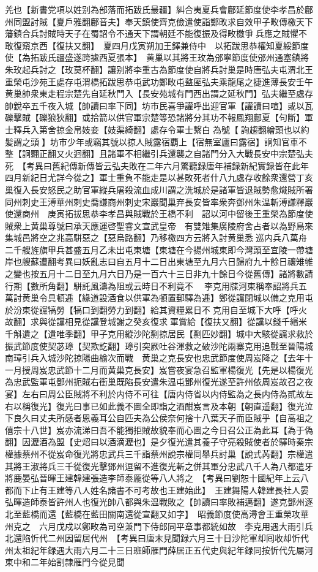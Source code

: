 羌也【新書党項以姓别為部落而拓跋氏最疆】糾合夷夏兵會鄜延節度使李孝昌於鄜州同盟討賊【夏戶雅翻鄜音夫】奉天鎮使齊克儉遣使詣鄭畋求自效甲子畋傳檄天下藩鎮合兵討賊時天子在蜀詔令不通天下謂朝廷不能復振及得畋檄爭兵應之賊懼不敢復窺京西【復扶又翻】　夏四月戊寅朔加王鐸兼侍中　以拓跋思恭權知夏綏節度使【為拓跋氏疆盛遂跨㨿西夏張本】　黄巢以其將王玫為邠寧節度使邠州通塞鎮將朱玫起兵討之【玫莫杯翻】讓别將李重古為節度使自將兵討巢是時唐弘夫屯渭北王重榮屯沙苑王處存屯渭橋拓跋思恭屯武功鄭畋屯盩厔弘夫乘龍尾之捷進薄長安壬午黄巢帥衆東走程宗楚先自延秋門入【長安苑城有門西出謂之延秋門】弘夫繼至處存帥銳卒五千夜入城【帥讀曰率下同】坊市民喜爭讙呼出迎官軍【讙讀曰喧】或以瓦礫擊賊【礫狼狄翻】或拾箭以供官軍宗楚等恐諸將分其功不報鳳翔鄜夏【句斷】軍士釋兵入第舍掠金帛妓妾【妓渠綺翻】處存令軍士繫白為號【詢趨翻繒頭也以約髪謂之頭】坊市少年或竊其號以掠人賊露宿覇上【宿無室廬曰露宿】詗知官車不整【詗翾正翻又火迥翻】且諸軍不相繼引兵還襲之自諸門分入大戰長安中宗楚弘夫死　【考異曰舊紀傳新傳皆云弘夫敗在二年六月驚聽録唐年補録新紀實録皆在此年四月新紀日尤詳今從之】軍士重負不能走是以甚敗死者什八九處存收餘衆還營丁亥巢復入長安怒民之助官軍縱兵屠殺流血成川謂之洗城於是諸軍皆退賊勢愈熾賊所署同州刺史王溥華州刺史喬謙商州刺史宋巖聞巢弃長安皆率衆奔鄧州朱温斬溥謙釋巖使還商州　庚寅拓拔思恭李孝昌與賊戰於王橋不利　詔以河中留後王重榮為節度使　賊衆上黄巢尊號曰承天應運啓聖睿文宣武皇帝　有雙雉集廣陵府舍占者以為野鳥來集城邑將空之兆高駢惡之【惡烏路翻】乃移檄四方云將入討黄巢悉巡内兵八萬舟二千艘旌旗甲兵甚盛五月乙未出屯東塘【東塘在今揚州城東即今灣頭至宜陵一帶塘岸也艘蘇遭翻考異曰妖亂志曰自五月十二日出東塘至九月六日歸府九十餘日禳雉雊之變也按五月十二日至九月六日乃是一百六十三日非九十餘日今從舊傳】諸將數請行期【數所角翻】駢託風濤為阻或云時日不利竟不　李克用牒河東稱奉詔將兵五萬討黄巢令具頓逓【緣道設酒食以供軍為頓置郵驛為逓】鄭從讜閉城以備之克用屯於汾東從讜犒勞【犒口到翻勞力到翻】給其資糧累日不克用自至城下大呼【呼火故翻】求與從讜相見從讜登城謝之癸亥復求軍賞給【復扶又翻】從讜以錢千緡米千斛遺之【遺唯季翻】甲子克用縱沙陀剽掠居民【剽匹妙翻】城中大駭從讜求救於振武節度使契苾璋【契欺訖翻】璋引突厥吐谷渾救之破沙陀兩寨克用追戰至晉陽城南璋引兵入城沙陀掠陽曲榆次而戰　黄巢之克長安也忠武節度使周岌降之【去年十一月授周岌忠武節十二月而黄巢克長安】岌嘗夜宴急召監軍楊復光【先是以楊復光為忠武監軍屯鄧州扼賊右衝巢既陷長安遣朱温屯鄧州復光遂至許州依周岌故召之夜宴】左右曰周公臣賊將不利於内侍不可往【唐内侍省以内侍監為之長内侍為貳故左右以稱復光】復光曰事已如此義不圖全即詣之酒酣岌言及本朝【朝直遥翻】復光泣下良久曰丈夫所感者恩義耳公自匹夫為公侯奈何捨十八葉天子而臣賊乎【自高祖之僖宗十八世】岌亦流涕曰吾不能獨拒賊故貌奉而心圖之今日召公正為此耳【為于偽翻】因瀝酒為盟【史炤曰以酒滴瀝也】是夕復光遣其養子守亮殺賊使者於驛時秦宗權據蔡州不從岌命復光將忠武兵三千詣蔡州說宗權同舉兵討巢【說式芮翻】宗權遣其將王淑將兵三千從復光擊鄧州逗留不進復光斬之併其軍分忠武八千人為八都遣牙將鹿晏弘晉暉王建韓建張造李師泰龎從等八人將之　【考異曰劉恕十國紀年上云八都而下止有王建等八人姓名諸書不可考故也王建始此】　王建舞陽人韓建長社人晏弘暉造師泰皆許州人也復光帥八都與朱温戰敗之【帥讀曰率敗補邁翻】遂克鄧州逐北至藍橋而還【藍橋在藍田關南還從宣翻又如字】　昭義節度使高潯會王重榮攻華州克之　六月戊戍以鄭畋為司空兼門下侍郎同平章事都統如故　李克用遇大雨引兵北還陷忻代二州因留居代州　【考異曰唐末見聞録六月三十日沙陀軍却囘收却忻代州太祖紀年録遇大雨六月二十三日班師雁門薛居正五代史與紀年録同按忻代先屬河東中和二年始割隸雁門今從見聞